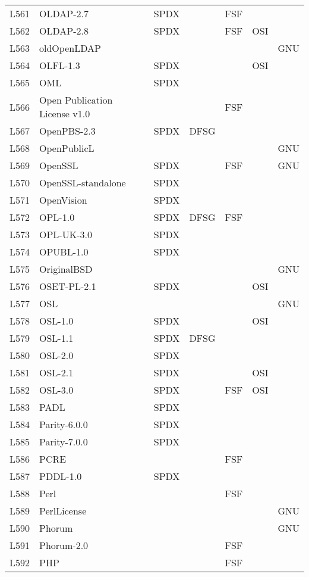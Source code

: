 \begin{longtable}[h]{m{2cm} | m{7cm} | c | c | c | c | c}
  L561 & OLDAP-2.7 & SPDX &  & FSF &  &  \\
  L562 & OLDAP-2.8 & SPDX &  & FSF & OSI &  \\
  L563 & oldOpenLDAP &  &  &  &  & GNU \\
  L564 & OLFL-1.3 & SPDX &  &  & OSI &  \\
  L565 & OML & SPDX &  &  &  &  \\
  L566 & Open Publication License v1.0 &  &  & FSF &  &  \\
  L567 & OpenPBS-2.3 & SPDX & DFSG &  &  &  \\
  L568 & OpenPublicL &  &  &  &  & GNU \\
  L569 & OpenSSL & SPDX &  & FSF &  & GNU \\
  L570 & OpenSSL-standalone & SPDX &  &  &  &  \\
  L571 & OpenVision & SPDX &  &  &  &  \\
  L572 & OPL-1.0 & SPDX & DFSG & FSF &  &  \\
  L573 & OPL-UK-3.0 & SPDX &  &  &  &  \\
  L574 & OPUBL-1.0 & SPDX &  &  &  &  \\
  L575 & OriginalBSD &  &  &  &  & GNU \\
  L576 & OSET-PL-2.1 & SPDX &  &  & OSI &  \\
  L577 & OSL &  &  &  &  & GNU \\
  L578 & OSL-1.0 & SPDX &  &  & OSI &  \\
  L579 & OSL-1.1 & SPDX & DFSG &  &  &  \\
  L580 & OSL-2.0 & SPDX &  &  &  &  \\
  L581 & OSL-2.1 & SPDX &  &  & OSI &  \\
  L582 & OSL-3.0 & SPDX &  & FSF & OSI &  \\
  L583 & PADL & SPDX &  &  &  &  \\
  L584 & Parity-6.0.0 & SPDX &  &  &  &  \\
  L585 & Parity-7.0.0 & SPDX &  &  &  &  \\
  L586 & PCRE &  &  & FSF &  &  \\
  L587 & PDDL-1.0 & SPDX &  &  &  &  \\
  L588 & Perl &  &  & FSF &  &  \\
  L589 & PerlLicense &  &  &  &  & GNU \\
  L590 & Phorum &  &  &  &  & GNU \\
  L591 & Phorum-2.0 &  &  & FSF &  &  \\
  L592 & PHP &  &  & FSF &  &  \\

\end{longtable}

